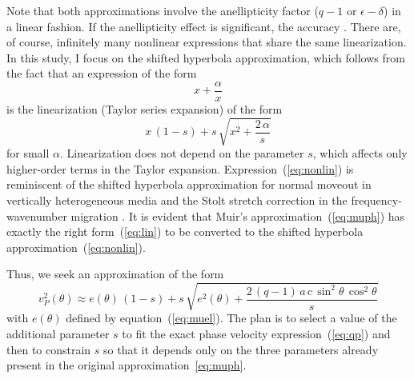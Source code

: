 Note that both approximations involve the anellipticity factor ($q-1$ or
$\epsilon-\delta$) in a linear fashion. If the anellipticity effect is
significant, the accuracy . There are, of
course, infinitely many nonlinear expressions that share the same
linearization. In this study, I focus on the shifted hyperbola approximation,
which follows from the fact that an expression of the form
 \begin{equation}
   \label{eq:lin}
   x + \frac{\alpha}{x}   
 \end{equation}
is the linearization (Taylor series expansion) of the form
\begin{equation}
  \label{eq:nonlin}
  x\,(1-s) + s\,\sqrt{x^2 + \frac{2\,\alpha}{s}}
\end{equation}
for small $\alpha$. Linearization does not depend on the parameter $s$, which
affects only higher-order terms in the Taylor expansion.
Expression~(\ref{eq:nonlin}) is reminiscent of the shifted hyperbola
approximation for normal moveout in vertically heterogeneous media
\cite[]{malov,Sword.sep.51.313,GEO53-02-01430157,GEO59-06-09830999} and the
Stolt stretch correction in the frequency-wavenumber migration
\cite[]{GEO43-01-00230048,mystolt}. It is evident that Muir's
approximation~(\ref{eq:muph}) has exactly the right form~(\ref{eq:lin}) to be
converted to the shifted hyperbola approximation~(\ref{eq:nonlin}). 

Thus, we seek an approximation of the form
\begin{equation}
  \label{eq:shiftm}
  v_P^2(\theta) \approx e(\theta)\,(1-s) + s\,\sqrt{e^2(\theta) + 
    \frac{2\,(q-1)\,a\,c\,
      \sin^2{\theta}\,\cos^2{\theta}}{s}}
\end{equation}
with $e(\theta)$ defined by equation~(\ref{eq:muel}). The plan is to select a
value of the additional parameter $s$ to fit the exact phase velocity
expression~(\ref{eq:qp}) and then to constrain $s$ so that it depends only on
the three parameters already present in the original
approximation~\eqref{eq:muph}.


